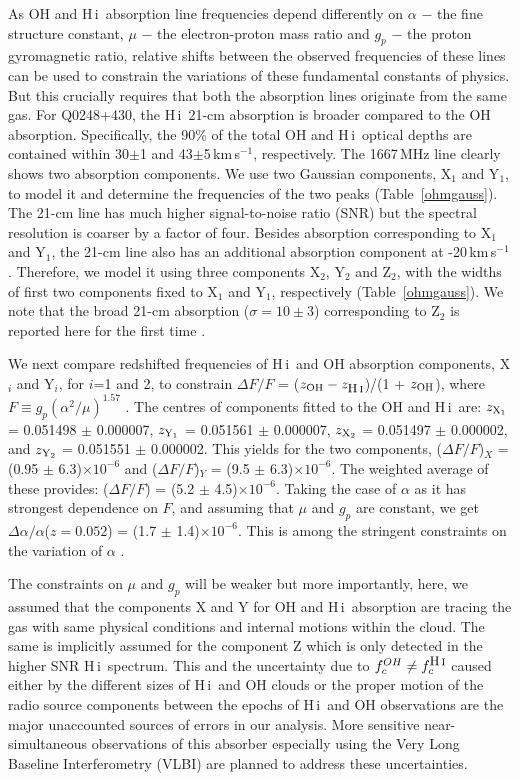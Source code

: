 \documentclass[iop,apjl,numberedappendix,appendixfloats,twocolappendix,revtex4]{emulateapj}
\newcommand{\hi}{\mbox{H\,{\sc i}}}
\newcommand{\kms}{km\,s$^{-1}$}
\begin{document}
As OH and \hi\ absorption line frequencies depend differently on $\alpha$ $-$ the fine structure constant, $\mu$ $-$ 
the electron-proton mass ratio and $g_p$ $-$ the proton gyromagnetic ratio, relative shifts between the observed 
frequencies of these lines can be used to constrain the variations of these fundamental constants of physics. 
But this crucially requires that both the absorption lines originate from the same gas.  
For Q0248+430, the \hi\ 21-cm absorption is broader compared to the OH absorption. Specifically, the 90\% of the total 
OH and \hi\ optical depths are contained within 30$\pm$1 and 43$\pm$5\,\kms, respectively. 
The 1667\,MHz line clearly shows two absorption components.  We use two Gaussian components, X$_1$ and Y$_1$, to model 
it and determine the frequencies of the two peaks (Table~\ref{ohmgauss}).   
The 21-cm line has much higher signal-to-noise ratio (SNR) but the spectral resolution is coarser by a factor of four.  
Besides absorption corresponding to X$_1$ and Y$_1$, the 21-cm line also has an additional absorption component at -20\,\kms.  
Therefore, we model it using three components X$_2$, Y$_2$ and Z$_2$, with the widths of first two components fixed to X$_1$ 
and Y$_1$, respectively (Table~\ref{ohmgauss}).  We note that the broad 21-cm absorption ($\sigma=10\pm3$) corresponding to Z$_2$ is 
reported here for the first time \citep[cf. Fig.~7 of][]{Hwang04}.  

We next compare redshifted frequencies of \hi\ and OH absorption components, X$_i$ and Y$_i$, for $i$=1 and 2, to 
constrain $\Delta F/F$  = ($z_{\rm OH} - z_{\small \hi}$)/(1 + $z_{\rm OH}$), where $F \equiv g_p (\alpha^2/\mu)^{1.57}$ \citep[][]{Uzan11}. 
The centres of components fitted to the OH and \hi\ are: 
$z_{\rm X_1}$ = 0.051498 $\pm$ 0.000007, 
$z_{\rm Y_1}$ = 0.051561 $\pm$ 0.000007,
$z_{\rm X_2}$ = 0.051497 $\pm$ 0.000002, and
$z_{\rm Y_2}$ = 0.051551 $\pm$ 0.000002. 
This yields for the two components, ($\Delta F/F$)$_X$ = (0.95 $\pm$ 6.3)$\times 10^{-6}$ and ($\Delta F/F$)$_Y$ = (9.5 $\pm$ 6.3)$\times 10^{-6}$.  
The weighted average of these provides:   ($\Delta F/F$) = (5.2 $\pm$ 4.5)$\times 10^{-6}$.  
Taking the case of $\alpha$ as it has strongest dependence on $F$, and assuming that $\mu$ and $g_p$ are constant, we get 
$\Delta\alpha/\alpha$($z=0.052$) = 
(1.7 $\pm$ 1.4)$\times 10^{-6}$.  This is among the stringent constraints on the variation of $\alpha$ \citep[][]{Rahmani12, Kanekar18}.  

The constraints on $\mu$ and $g_p$ will be weaker but more importantly, here,  
we assumed that the components X and Y for OH and \hi\ absorption are tracing the gas with same physical conditions and internal motions 
within the cloud.  The same is implicitly assumed for the component Z which is only detected in the higher SNR \hi\ spectrum.  This and the 
uncertainty due to $f_c^{OH} \neq f_c^{\small \hi}$ caused either by the different sizes of \hi\ and OH clouds or the proper motion of the 
radio source components between the epochs of \hi\ and OH observations are the major unaccounted sources of errors in our analysis. 
More sensitive near-simultaneous observations of this absorber especially using the Very Long Baseline Interferometry (VLBI) are planned to address these uncertainties. 
  
\end{document}
